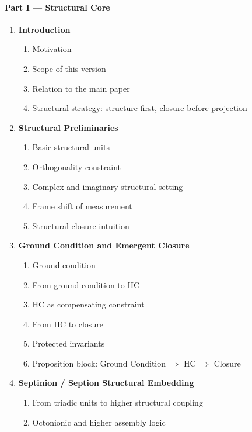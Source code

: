\paragraph{Part I --- Structural Core}
\begin{enumerate}[leftmargin=2em,label=\arabic*.]
  \item \textbf{Introduction}
    \begin{enumerate}[label*=\arabic*., leftmargin=2.5em]
      \item Motivation
      \item Scope of this version
      \item Relation to the main paper
      \item Structural strategy: structure first, closure before projection
    \end{enumerate}
  \item \textbf{Structural Preliminaries}
    \begin{enumerate}[label*=\arabic*., leftmargin=2.5em]
      \item Basic structural units
      \item Orthogonality constraint
      \item Complex and imaginary structural setting
      \item Frame shift of measurement
      \item Structural closure intuition
    \end{enumerate}
  \item \textbf{Ground Condition and Emergent Closure}
    \begin{enumerate}[label*=\arabic*., leftmargin=2.5em]
      \item Ground condition
      \item From ground condition to HC
      \item HC as compensating constraint
      \item From HC to closure
      \item Protected invariants
      \item Proposition block: Ground Condition $\Rightarrow$ HC $\Rightarrow$ Closure
    \end{enumerate}
  \item \textbf{Septinion / Seption Structural Embedding}
    \begin{enumerate}[label*=\arabic*., leftmargin=2.5em]
      \item From triadic units to higher structural coupling
      \item Octonionic and higher assembly logic

\end{enumerate}
\end{enumerate}
